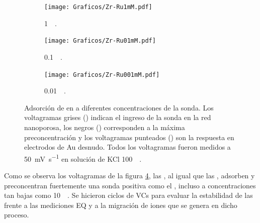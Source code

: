 	 			\begin{figure}[th]
			   	    \begin{subfigure}[t]{0.325\textwidth}
			        	\texttt{[image: Graficos/Zr-Ru1mM.pdf]}
			        	\vspace*{-0.40cm}\caption{\aminorutenio\space \SI{1}{\milli\Molar}.}
			         	\label{fig:Zr-Ru1mM}
			     		\end{subfigure}
			   	    \begin{subfigure}[t]{0.325\textwidth}
			        	\texttt{[image: Graficos/Zr-Ru01mM.pdf]}
			       		\vspace*{-0.40cm}\caption{\aminorutenio\space \SI{0.1}{\milli\Molar}.}
			         	\label{fig:Zr-Ru0.1mM}
			     		\end{subfigure}
		     		\begin{subfigure}[t]{0.325\textwidth}
			        	\texttt{[image: Graficos/Zr-Ru001mM.pdf]}
			       		\vspace*{-0.40cm}\caption{\aminorutenio\space \SI{0.01}{\milli\Molar}.}
			         	\label{fig:Zr-Ru0.01mM}
			     		\end{subfigure}
			     		\caption[Preconcentración de \aminorutenio\space en \pdmZ]{Adsorción de \ru\space en \pdmZ\space a diferentes concentraciones de la sonda. Los voltagramas grises (\usebox{\gris}) indican el ingreso de la sonda en la red nanoporosa, los negros (\usebox{\negro}) corresponden a la máxima preconcentración y los voltagramas punteados (\usebox{\punteado}) son la respuesta en electrodos de Au  desnudo. Todos los voltagramas fueron medidos a \SI{50}{\milli\volt\per\second} en solución de KCl \SI{100}{\milli\Molar}.}
			     		\label{fig:precon_ZR}
		     		\end{figure}
		
		 Como se observa los voltagramas de la figura \ref{fig:precon_ZR}, las \pdmZ, al igual que las \pdmF, adsorben y preconcentran fuertemente una sonda positiva como el \ru,	incluso a concentraciones tan bajas como \SI{10}{\micro\Molar}. Se hicieron ciclos de VCs para evaluar la estabilidad de las \pdmZ\space frente a las mediciones EQ y a la migración de iones que se genera en dicho proceso. 

